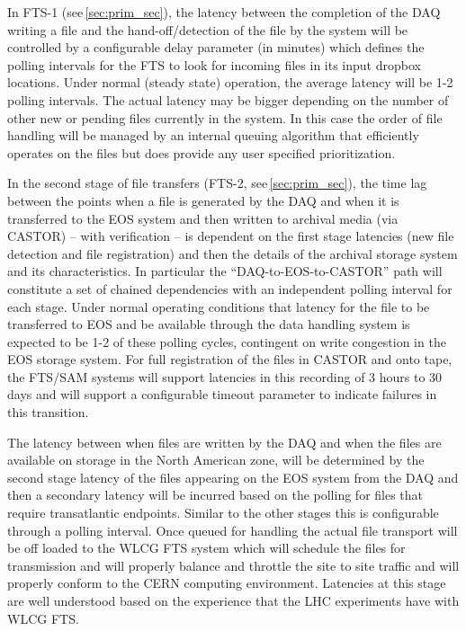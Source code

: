 \documentclass[12pt]{article}
\begin{document}
In FTS-1 (see\,\ref{sec:prim_sec}), the latency between the completion of the DAQ writing a file and the hand-off/detection of the file by the
system will be controlled by a configurable delay parameter (in minutes) which defines the polling intervals for the FTS
to look for  incoming files in its input dropbox locations.  Under normal (steady state) operation, the average latency will be 1-2 polling intervals.
The actual latency may be bigger depending on the number of other new or pending files currently in the system.
In this case the order of file handling will be managed by an internal queuing algorithm that efficiently operates on the files but
does provide any user specified prioritization.

In the second stage of file transfers (FTS-2, see\,\ref{sec:prim_sec}), the time lag between the points when a file is generated by the DAQ
and when it is transferred to the EOS
system and then written to archival media (via CASTOR) -- with verification --  is dependent on the first stage latencies (new file detection and file registration)
and then the details of the archival storage system and its characteristics.  In particular the ``DAQ-to-EOS-to-CASTOR'' path will constitute a set
of chained dependencies with an independent polling interval for each stage.  Under normal operating conditions that latency for the file to
be transferred to EOS and be available through the data handling system is expected to be 1-2 of these polling cycles, contingent on write
congestion in the EOS storage system.   For full registration of the files in CASTOR and onto tape, the FTS/SAM systems will support latencies
in this recording of 3 hours to 30 days and will support a configurable timeout parameter to indicate failures in this transition.

The latency between when files are written by the DAQ and when the files are available on storage in the North American zone,
will be determined by the second stage latency of the files appearing on the EOS system from the DAQ and then a secondary latency
will be incurred based on the polling for files that require transatlantic endpoints.  Similar to the other stages this is configurable
through a polling interval.  Once queued for handling the actual file transport will be off loaded to the WLCG FTS system which will
schedule the files for transmission and will properly balance and throttle the site to site traffic and will properly conform to the CERN
 computing environment.  Latencies at this stage are well understood based on the experience that the LHC experiments have with WLCG FTS.  
\end{document}
